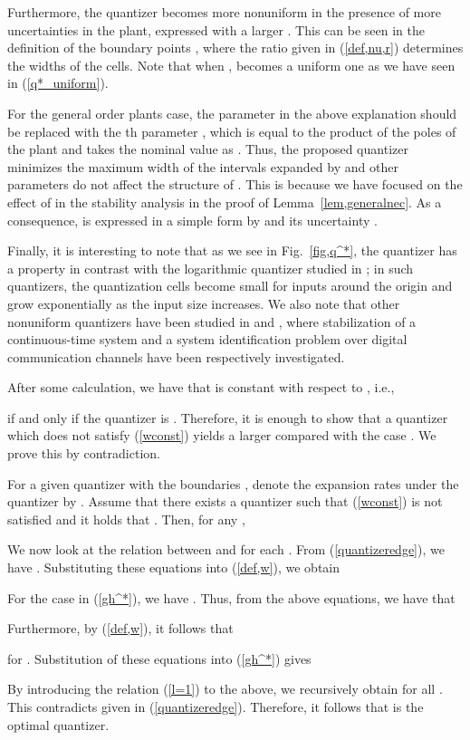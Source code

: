 \documentclass[a4paper, 11pt]{article}
\makeatletter
\theoremstyle{definition}
\newenvironment{pf}[1][\proofname]{\par\pushQED{\qed}
 \normalfont\topsep6\p@\@plus6\p@\relax\trivlist\item[\hskip\labelsep\bfseries#1\@addpunct{.}]
 \ignorespaces}{\popQED\endtrivlist\@endpefalse}
\newcommand{\fref}[1]{Fig.~\ref{#1}}
\makeatother
\begin{document}
Furthermore, the quantizer  becomes more nonuniform in the presence
of more uncertainties in the plant, expressed with a larger .
This can be seen in the definition of the boundary points ,
where the ratio  given in (\ref{def,nu,r}) determines
the widths of the cells.
Note that when ,  becomes a uniform one as we have
seen in (\ref{q*_uniform}).

For the general order plants case, the parameter  in the above explanation
should be replaced with the th parameter , which is equal to the product
of the poles of the plant and takes the nominal value as .
Thus, the proposed quantizer  minimizes the maximum width of the
intervals expanded by  and other parameters do not affect the structure
of .
This is because we have focused on the effect of  in the stability
analysis in the proof of Lemma~\ref{lem,generalnec}.
As a consequence,  is expressed in a simple form by 
and its uncertainty .

Finally, it is interesting to note that as we see in \fref{fig,q^*}, the quantizer
 has a property in contrast with the logarithmic quantizer studied
in \cite{Elia2001, Fu2005, Hayakawa2009, Tsumura2009};
in such quantizers, the quantization cells become small for inputs around the origin
and grow exponentially as the input size increases.
We also note that other nonuniform quantizers have been studied in \cite{Li2004}
and \cite{Tsumura2009a}, where stabilization of a continuous-time system
and a system identification problem over digital communication channels
have been respectively investigated.


\begin{pf}[Proof of Lemma~\ref{lem,opt_q}]
After some calculation, we have that  is constant with respect to ,
i.e.,

if and only if the quantizer is .
Therefore, it is enough to show that a quantizer which does not satisfy
(\ref{wconst}) yields a larger  compared with the case .
We prove this by contradiction.

For a given quantizer with the boundaries ,
denote the expansion rates  under the quantizer by .
Assume that there exists a quantizer  such that (\ref{wconst}) is
not satisfied and it holds that .
Then, for any ,


We now look at the relation between  and  for each .
From (\ref{quantizeredge}), we have .
Substituting these equations into (\ref{def,w}), we obtain

For the case  in (\ref{gh^*}), we have .
Thus, from the above equations, we have that

Furthermore, by (\ref{def,w}), it follows that

for .
Substitution of these equations into (\ref{gh^*}) gives

By introducing the relation (\ref{l=1}) to the above, we recursively obtain
 for all .
This contradicts 
given in (\ref{quantizeredge}). Therefore, it follows that 
is the optimal quantizer.
\end{pf}
\end{document}
